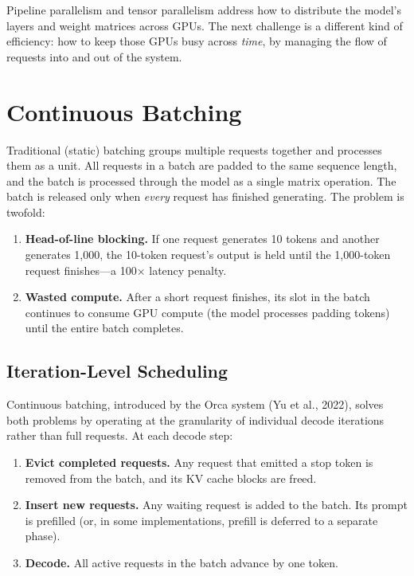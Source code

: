Pipeline parallelism and tensor parallelism address how to distribute the model's layers and weight matrices across GPUs. The next challenge is a different kind of efficiency: how to keep those GPUs busy across \emph{time}, by managing the flow of requests into and out of the system.

\section{Continuous Batching}
\label{sec:distributed:batching}

%
Traditional (static) batching groups multiple requests together and processes them as a unit. All requests in a batch are padded to the same sequence length, and the batch is processed through the model as a single matrix operation. The batch is released only when \emph{every} request has finished generating. The problem is twofold:

\begin{enumerate}
\item \textbf{Head-of-line blocking.} If one request generates 10 tokens and another generates 1{,}000, the 10-token request's output is held until the 1{,}000-token request finishes---a 100$\times$ latency penalty.
\item \textbf{Wasted compute.} After a short request finishes, its slot in the batch continues to consume GPU compute (the model processes padding tokens) until the entire batch completes.
\end{enumerate}

\subsection{Iteration-Level Scheduling}

Continuous batching, introduced by the Orca system (Yu et al., 2022), solves both problems by operating at the granularity of individual decode iterations rather than full requests. At each decode step:

\begin{enumerate}
\item \textbf{Evict completed requests.} Any request that emitted a stop token is removed from the batch, and its KV cache blocks are freed.
\item \textbf{Insert new requests.} Any waiting request is added to the batch. Its prompt is prefilled (or, in some implementations, prefill is deferred to a separate phase).
\item \textbf{Decode.} All active requests in the batch advance by one token.
\end{enumerate}

